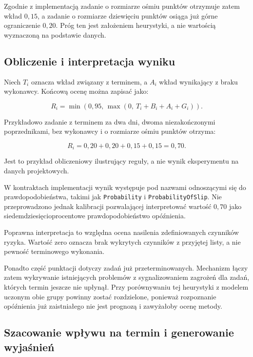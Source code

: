Zgodnie z implementacją zadanie o rozmiarze ośmiu punktów otrzymuje zatem wkład \(0{,}15\), a zadanie o rozmiarze dziewięciu punktów osiąga już górne ograniczenie \(0{,}20\). Próg ten jest założeniem heurystyki, a nie wartością wyznaczoną na podstawie danych.

\subsection{Obliczenie i interpretacja wyniku}

Niech \(T_i\) oznacza wkład związany z terminem, a \(A_i\) wkład wynikający z braku wykonawcy. Końcową ocenę można zapisać jako:

\begin{equation}
    R_i =
    \min\left(
        0{,}95,\,
        \max(0,\ T_i+B_i+A_i+G_i)
    \right).
    \label{eq:ryzyko-koncowe}
\end{equation}

Przykładowo zadanie z terminem za dwa dni, dwoma niezakończonymi poprzednikami, bez wykonawcy i o rozmiarze ośmiu punktów otrzyma:

\begin{equation}
    R_i =
    0{,}20+0{,}20+0{,}15+0{,}15
    = 0{,}70.
    \label{eq:ryzyko-przyklad}
\end{equation}

Jest to przykład obliczeniowy ilustrujący reguły, a nie wynik eksperymentu na danych projektowych.

W kontraktach implementacji wynik występuje pod nazwami odnoszącymi się do prawdopodobieństwa, takimi jak \texttt{Probability} i \texttt{ProbabilityOfSlip}. Nie przeprowadzono jednak kalibracji pozwalającej interpretować wartość \(0{,}70\) jako siedemdziesięcioprocentowe prawdopodobieństwo opóźnienia.

Poprawna interpretacja to względna ocena nasilenia zdefiniowanych czynników ryzyka. Wartość zero oznacza brak wykrytych czynników z przyjętej listy, a nie pewność terminowego wykonania.

Ponadto część punktacji dotyczy zadań już przeterminowanych. Mechanizm łączy zatem wykrywanie istniejących problemów z sygnalizowaniem zagrożeń dla zadań, których termin jeszcze nie upłynął. Przy porównywaniu tej heurystyki z modelem uczonym obie grupy powinny zostać rozdzielone, ponieważ rozpoznanie opóźnienia już zaistniałego nie jest prognozą i zawyżałoby ocenę metody.

\subsection{Szacowanie wpływu na termin i generowanie wyjaśnień}


